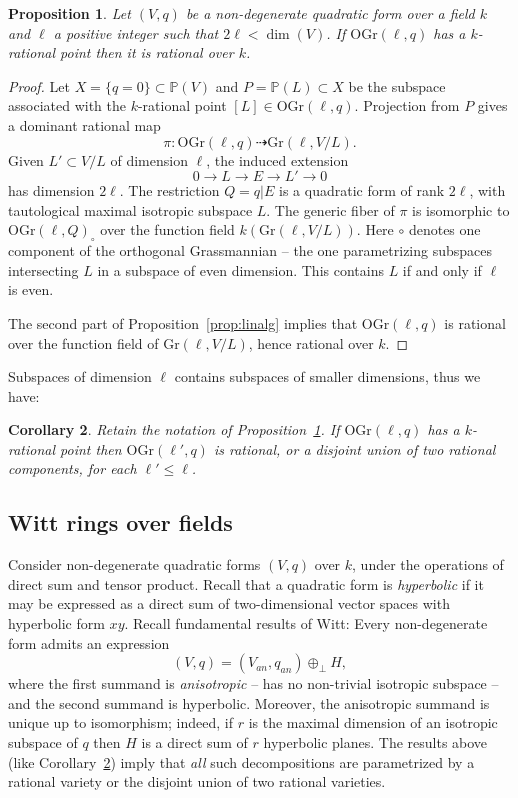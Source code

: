 \documentclass[12pt]{amsart}
\numberwithin{equation}{section}
\newcommand{\ra}{\rightarrow}
\newcommand{\bP}{\mathbb{P}}
\newcommand{\Gr}{\mathrm{Gr}}
\newcommand{\OGr}{\mathrm{OGr}}
\theoremstyle{plain}
\newtheorem{prop}{Proposition}[section]
\newtheorem{coro}[prop]{Corollary}
\theoremstyle{definition}
\theoremstyle{remark}
\begin{document}
\begin{prop} \label{prop:pointtorat}
Let $(V,q)$ be a non-degenerate quadratic form 
over a field $k$ and $\ell$ a positive integer
such that $2\ell < \dim(V)$. If 
$\OGr(\ell,q)$ has a $k$-rational point 
then it is rational over $k$.
\end{prop}
\begin{proof}
Let $X=\{q=0\} \subset \bP(V)$ and 
$P=\bP(L) \subset X$ be the subspace
associated with the $k$-rational point
$[L] \in \OGr(\ell,q)$. Projection
from $P$ gives a dominant rational map
$$\pi:\OGr(\ell,q) \dashrightarrow \Gr(\ell,V/L).$$
Given $L'\subset V/L$ of dimension $\ell$, the induced
extension 
$$0 \ra L \ra E \ra L'\ra 0$$
has dimension $2\ell$. The restriction $Q=q|E$ 
is a quadratic form of rank $2\ell$, with tautological maximal isotropic subspace $L$.  
The generic fiber of $\pi$ is isomorphic to $\OGr(\ell,Q)_{\circ}$ 
over the function field $k(\Gr(\ell,V/L))$. 
Here $\circ$ denotes 
one component of the orthogonal Grassmannian --
the one parametrizing subspaces intersecting $L$
in a subspace of even dimension.
This contains $L$ if and only if $\ell$ is even.

The second part of Proposition~\ref{prop:linalg}
implies that $\OGr(\ell,q)$ is rational
over the function field of $\Gr(\ell,V/L)$,
hence rational over $k$.
\end{proof}
Subspaces of dimension $\ell$ contains
subspaces of smaller dimensions, thus we have:
\begin{coro} \label{coro:ratsmalldim}
Retain the notation of Proposition~\ref{prop:pointtorat}.
If $\OGr(\ell,q)$ has a $k$-rational point 
then $\OGr(\ell',q)$ is rational, or a disjoint union of two
rational components, for each $\ell' \le \ell$.
\end{coro}


\subsection*{Witt rings over fields}
Consider non-degenerate quadratic forms $(V,q)$ over $k$,
under the operations of direct sum and tensor product.  
Recall that a quadratic form is {\em hyperbolic} if it may be
expressed as a direct sum of two-dimensional vector spaces
with hyperbolic form $xy$. Recall fundamental results of 
Witt: Every non-degenerate form admits an expression
$$
(V,q) = (V_{an},q_{an}) \oplus_{\perp} H,
$$
where the first summand is {\em anisotropic} -- has no 
non-trivial isotropic subspace -- and the second summand is hyperbolic.
Moreover, the anisotropic summand is unique up to isomorphism;
indeed, if $r$ is the maximal dimension of an isotropic subspace
of $q$ then $H$ is a direct sum of $r$ hyperbolic planes.  
The results above (like Corollary~\ref{coro:ratsmalldim})
imply that {\em all} such
decompositions are parametrized by a rational variety or the 
disjoint union of two rational varieties.
\end{document}
